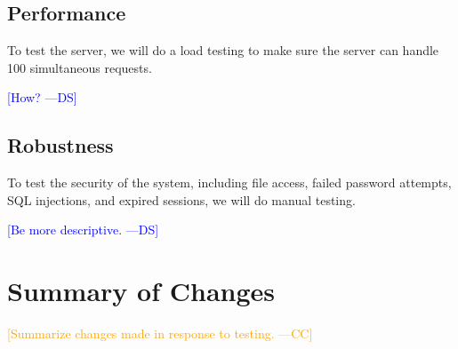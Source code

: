 \documentclass[12pt]{article}
\newcommand{\authornote}[3]{\textcolor{#1}{[#3 ---#2]}}
\newcommand{\authornote}[3]{}
\newcommand{\ds}[1]{\authornote{blue}{DS}{#1}}
\newcommand{\cc}[1]{\authornote{orange}{CC}{#1}}
\begin{document}
\subsection{Performance}
To test the server, we will do a load testing to make sure the server can handle 100 simultaneous requests.

\ds{How?}

\subsection{Robustness}
To test the security of the system, including file access, failed password attempts, SQL injections, and expired sessions, we will do manual testing.

\ds{Be more descriptive.}

\section{Summary of Changes}
\cc{Summarize changes made in response to testing.}
\end{document}
